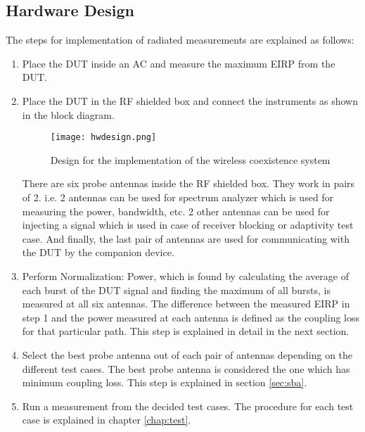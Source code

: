 \subsection{Hardware Design}
The steps for implementation of radiated measurements are explained as follows:
\begin{enumerate}
  \item Place the \acs{DUT} inside an \acf{AC} and measure the maximum \acs{EIRP} from the \acs{DUT}.
  \item Place the \acs{DUT} in the \acs{RF} shielded box and connect the instruments as shown in the block diagram.

\begin{figure}[H]
\centering
\texttt{[image: hwdesign.png]}
\caption{Design for the implementation of the wireless coexistence system}
\label{fig:3} 
\end{figure}

There are six probe antennas inside the \acs{RF} shielded box. They work in pairs of 2. i.e. 2 antennas can be used for spectrum analyzer which is used for measuring the power, bandwidth, etc. 2 other antennas can be used for injecting a signal which is used in case of receiver blocking or adaptivity test case. And finally, the last pair of antennas are used for communicating with the \acs{DUT} by the companion device.

\item Perform Normalization: Power, which is found by calculating the average of each burst of the \acs{DUT} signal and finding the maximum of all bursts, is measured at all six antennas. The difference between the measured \acs{EIRP} in step 1 and the power measured at each antenna is defined as the coupling loss for that particular path. This step is explained in detail in the next section.

\item Select the best probe antenna out of each pair of antennas depending on the different test cases. The best probe antenna is considered the one which has minimum coupling loss. This step is explained in section \ref{sec:sba}. 

\item Run a measurement from the decided test cases. The procedure for each test case is explained in chapter \ref{chap:test}.

\end{enumerate}



